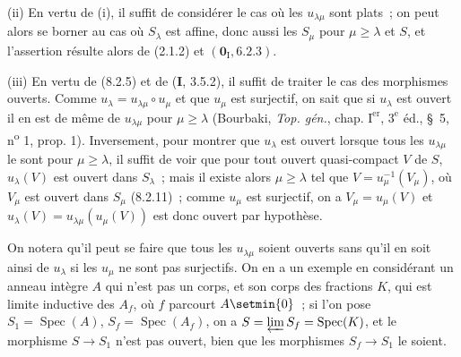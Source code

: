 \medskip
\noindent
(ii) En vertu de (i), il suffit de considérer le cas où les
$u_{\lambda\mu}$ sont plats~; on peut alors se borner au cas où $S_\lambda$
est affine, donc aussi les $S_\mu$ pour $\mu\geq\lambda$ et $S$, et
l'assertion résulte alors de (2.1.2) et $(\mathbf{0}_{\mathrm I},6.2.3)$.

\medskip
\noindent
(iii) En vertu de (8.2.5) et de (\textbf{I}, 3.5.2), il suffit de traiter le cas des
morphismes ouverts. Comme $u_\lambda=u_{\lambda\mu}\circ u_\mu$ et que
$u_\mu$ est surjectif, on sait que si $u_\lambda$ est ouvert il en est de
même de $u_{\lambda\mu}$ pour $\mu\geq\lambda$ (Bourbaki,
\emph{Top. gén.}, chap. $\mathrm I^{\mathrm{er}}$, $3^{\mathrm e}$ éd.,
\S~5, n\textsuperscript{o} 1, prop. 1).
Inversement, pour montrer que $u_\lambda$ est ouvert lorsque tous les
$u_{\lambda\mu}$ le sont pour $\mu\geq\lambda$, il suffit de voir que pour
tout ouvert quasi-compact $V$ de $S$, $u_\lambda(V)$ est ouvert dans
$S_\lambda$~; mais il existe alors $\mu\geq\lambda$ tel que
$V=u_\mu^{-1}(V_\mu)$, où $V_\mu$ est ouvert dans $S_\mu$ (8.2.11)~; comme
$u_\mu$ est surjectif, on a $V_\mu=u_\mu(V)$ et
$u_\lambda(V)=u_{\lambda\mu}(u_\mu(V))$ est donc ouvert par hypothèse.

On notera qu'il peut se faire que tous les $u_{\lambda\mu}$ soient ouverts
sans qu'il en soit ainsi de $u_\lambda$ si les $u_\mu$ ne sont pas
surjectifs. On en a un exemple en considérant un anneau intègre $A$ qui n'est
pas un corps, et son corps des fractions $K$, qui est limite inductive des
$A_f$, où $f$ parcourt $A\setmin\{0\}$~; si l'on pose
$S_1=\operatorname{Spec}(A)$, $S_f=\operatorname{Spec}(A_f)$, on a
$S=\varprojlim S_f=\operatorname{Spec}(K)$, et le morphisme $S\to S_1$ n'est
pas ouvert, bien que les morphismes $S_f\to S_1$ le soient.

